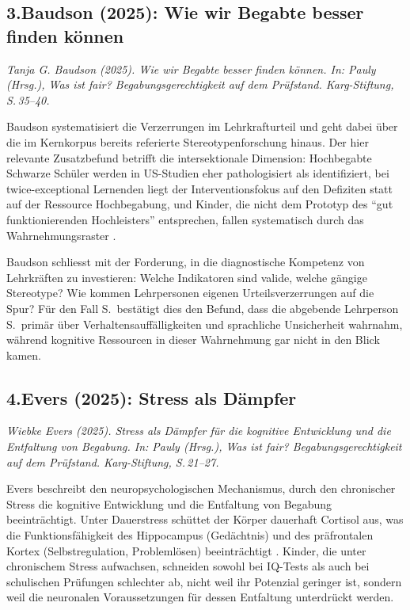 \documentclass[ngerman, a4paper]{article}
\begin{document}
\subsection*{3.\quad Baudson (2025): Wie wir Begabte besser finden können}

\textit{Tanja G. Baudson (2025). Wie wir Begabte besser finden können.
In: Pauly (Hrsg.), Was ist fair? Begabungsgerechtigkeit auf dem Prüfstand.
Karg-Stiftung, S.\,35--40.}

\medskip
Baudson systematisiert die Verzerrungen im Lehrkrafturteil und geht dabei über
die im Kernkorpus bereits referierte Stereotypenforschung
\parencite[S.\,115--120]{baudson2021wasdenken} hinaus. Der hier relevante
Zusatzbefund betrifft die intersektionale Dimension: Hochbegabte Schwarze
Schüler werden in US-Studien eher pathologisiert als identifiziert, bei
twice-exceptional Lernenden liegt der Interventionsfokus auf den Defiziten statt
auf der Ressource Hochbegabung, und Kinder, die nicht dem Prototyp des
\enquote{gut funktionierenden Hochleisters} entsprechen, fallen systematisch
durch das Wahrnehmungsraster
\parencite[S.\,38--39]{baudson2025besserfinden}.

Baudson schliesst mit der Forderung, in die diagnostische Kompetenz von
Lehrkräften zu investieren: Welche Indikatoren sind valide, welche gängige
Stereotype? Wie kommen Lehrpersonen eigenen Urteilsverzerrungen auf die Spur?
Für den Fall S.\ bestätigt dies den Befund, dass die abgebende Lehrperson S.\
primär über Verhaltensauffälligkeiten und sprachliche Unsicherheit wahrnahm, während
kognitive Ressourcen in dieser Wahrnehmung gar nicht in den Blick kamen.


\subsection*{4.\quad Evers (2025): Stress als Dämpfer}

\textit{Wiebke Evers (2025). Stress als Dämpfer für die kognitive Entwicklung
und die Entfaltung von Begabung. In: Pauly (Hrsg.), Was ist fair?
Begabungsgerechtigkeit auf dem Prüfstand. Karg-Stiftung, S.\,21--27.}

\medskip
Evers beschreibt den neuropsychologischen Mechanismus, durch den chronischer
Stress die kognitive Entwicklung und die Entfaltung von Begabung beeinträchtigt.
Unter Dauerstress schüttet der Körper dauerhaft Cortisol aus, was die
Funktionsfähigkeit des Hippocampus (Gedächtnis) und des präfrontalen Kortex
(Selbstregulation, Problemlösen) beeinträchtigt
\parencite[S.\,22--23]{evers2025stress}. Kinder, die unter chronischem Stress
aufwachsen, schneiden sowohl bei IQ-Tests als auch bei schulischen Prüfungen
schlechter ab, nicht weil ihr Potenzial geringer ist, sondern weil die
neuronalen Voraussetzungen für dessen Entfaltung unterdrückt werden.
\end{document}
